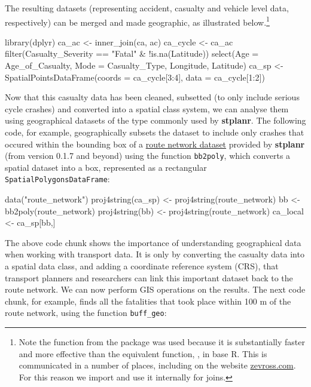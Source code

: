 The resulting datasets (representing accident, casualty and vehicle
level data, respectively) can be merged and made geographic, as
illustrated below.\footnote{
Note the  function from the  package was used because it is substantially faster and more effective than the equivalent function, , in base R.
This is communicated in a number of places, including on the website \href{http://zevross.com/blog/2014/04/30/mini-post-for-large-tables-in-r-dplyrs-function-inner_join-is-much-faster-than-merge/}{zevross.com}. For this reason we import  and use it internally for joins.}

\begin{Schunk}
\begin{Sinput}
library(dplyr)
ca_ac <- inner_join(ca, ac)
ca_cycle <- ca_ac %
  filter(Casualty_Severity == "Fatal" & !is.na(Latitude)) %
  select(Age = Age_of_Casualty, Mode = Casualty_Type, Longitude, Latitude)
ca_sp <- SpatialPointsDataFrame(coords = ca_cycle[3:4], data = ca_cycle[1:2])
\end{Sinput}
\end{Schunk}

Now that this casualty data has been cleaned, subsetted (to only include
serious cycle crashes) and converted into a spatial class system, we can
analyse them using geographical datasets of the type commonly used by
\textbf{stplanr}. The following code, for example, geographically
subsets the dataset to include only crashes that occured within the
bounding box of a
\href{https://github.com/ropensci/stplanr/blob/master/data/route_network.rda?raw=true}{route
network dataset} provided by \textbf{stplanr} (from version 0.1.7 and
beyond) using the function \texttt{bb2poly}, which converts a spatial
dataset into a box, represented as a rectangular
\texttt{SpatialPolygonsDataFrame}:

\begin{Schunk}
\begin{Sinput}
data("route_network")
proj4string(ca_sp) <- proj4string(route_network)
bb <- bb2poly(route_network)
proj4string(bb) <- proj4string(route_network)
ca_local <- ca_sp[bb,]
\end{Sinput}
\end{Schunk}

The above code chunk shows the importance of understanding geographical
data when working with transport data. It is only by converting the
casualty data into a spatial data class, and adding a coordinate
reference system (CRS), that transport planners and researchers can link
this important dataset back to the route network. We can now perform GIS
operations on the results. The next code chunk, for example, finds all
the fatalities that took place within 100 m of the route network, using
the function \texttt{buff\_geo}:

